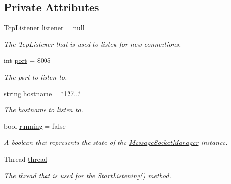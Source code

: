 \subsection*{Private Attributes}
\begin{DoxyCompactItemize}
\item 
Tcp\+Listener \hyperlink{class_e_l_i_server_1_1_message_socket_manager_a0c3b11ce72614567322dc025fd40c1c5}{listener} = null
\begin{DoxyCompactList}\small\item\em The Tcp\+Listener that is used to listen for new connections. \end{DoxyCompactList}\item 
int \hyperlink{class_e_l_i_server_1_1_message_socket_manager_af344f11a273d91f2d2c520583f105b95}{port} = 8005
\begin{DoxyCompactList}\small\item\em The port to listen to. \end{DoxyCompactList}\item 
string \hyperlink{class_e_l_i_server_1_1_message_socket_manager_afe7ddcd6b733f389617621037d713db4}{hostname} = \char`\"{}127...\char`\"{}
\begin{DoxyCompactList}\small\item\em The hostname to listen to. \end{DoxyCompactList}\item 
bool \hyperlink{class_e_l_i_server_1_1_message_socket_manager_ae7079918e3fb3c205ee8831f800cd4d9}{running} = false
\begin{DoxyCompactList}\small\item\em A boolean that represents the state of the \hyperlink{class_e_l_i_server_1_1_message_socket_manager}{Message\+Socket\+Manager} instance. \end{DoxyCompactList}\item 
Thread \hyperlink{class_e_l_i_server_1_1_message_socket_manager_a2c6114a87afeb4ecb1cbf42daea68df0}{thread}
\begin{DoxyCompactList}\small\item\em The thread that is used for the \hyperlink{class_e_l_i_server_1_1_message_socket_manager_ab5d2f61a349046960ae63303ff1c2130}{Start\+Listening()} method. \end{DoxyCompactList}\end{DoxyCompactItemize}
